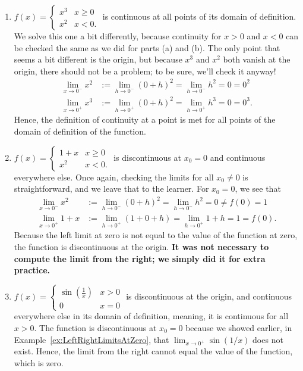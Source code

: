 \begin{enumerate}
    \item \Ans $f(x) = 
     \begin{cases} x^3 & x \ge 0 \\
                   x^2 & x < 0.
    \end{cases} $
    is continuous at all points of its domain of definition. We solve this one a bit differently, because continuity for $x>0$ and $x<0$ can be checked the same as we did for parts (a) and (b). The only point that seems a bit different is the origin, but because $x^3$ and $x^2$ both vanish at the origin, there should not be a problem; to be sure, we'll check it anyway!  
    \begin{align*}
       \lim_{x \to 0^-} x^2&:=  \lim_{h \to 0^-} (0+h)^2  =  \lim_{h \to 0^-} h^2 = 0 =  0^2\\
        \lim_{x \to 0^+} x^3 &:=  \lim_{h \to 0^+} (0+h)^2  =  \lim_{h \to 0^+} h^3 = 0 =  0^3.
    \end{align*}
    Hence, the definition of continuity at a point is met for all points of the domain of definition of the function.

     \item \Ans $f(x) = 
     \begin{cases} 1 + x & x \ge 0 \\
                   x^2 & x < 0.
    \end{cases} $ is discontinuous at $x_0=0$ and continuous everywhere else. Once again, checking the limits for all $x_0\neq 0$ is straightforward, and we leave that to the learner. For $x_0=0$, we see that
     \begin{align*}
       \lim_{x \to 0^-} x^2 &:=  \lim_{h \to 0^-} (0+h)^2  =  \lim_{h \to 0^-} h^2 = 0 \neq f(0)=1\\
        \lim_{x \to 0^+} 1+x &:=  \lim_{h \to 0^+} (1+0+h)  =  \lim_{h \to 0^+} 1+h = 1 =  f(0).
    \end{align*}
    Because the left limit at zero is not equal to the value of the function at zero, the function is discontinuous at the origin. {\bf It was not necessary to compute the limit from the right; we simply did it for extra practice.}

    \item \Ans $f(x) = \begin{cases} 
        \sin(\frac{1}{x}) & x >0 \\
        0 & x = 0
    \end{cases}$ is discontinuous at the origin, and continuous everywhere else in its domain of definition, meaning, it is continuous for all $x>0$. The function is discontinuous at $x_0=0$ because we showed earlier, in Example~\ref{ex:LeftRightLimitsAtZero}, that $ \displaystyle \lim_{x \to 0^+} \sin(1/x)$ does not exist. Hence, the limit from the right cannot equal the value of the function, which is zero. \\


\end{enumerate}
